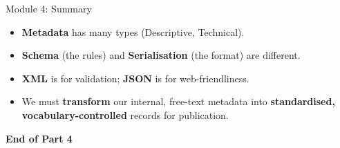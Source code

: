\begin{frame}{Module 4: Summary}
    \begin{itemize}
        \item \textbf{Metadata} has many types (Descriptive, Technical).
        \item \textbf{Schema} (the rules) and \textbf{Serialisation} (the format) are different.
        \item \textbf{XML} is for validation; \textbf{JSON} is for web-friendliness.
        \item We must \textbf{transform} our internal, free-text metadata into \textbf{standardised, vocabulary-controlled} records for publication.
    \end{itemize}
    \vfill
    \begin{center}
        \textbf{End of Part 4}
    \end{center}
\end{frame}